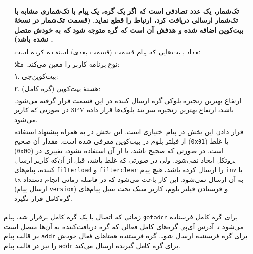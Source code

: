 \begin{xltabular}{\textwidth}{|c|X|}
	\hline
	 & {
		تک‌شمار، یک عدد تصادفی است که اگر یک گره،‌ یک پیام با تک‌شماری مشابه با تک‌شمار ارسالی دریافت کرد، ارتباط را قطع نماید. (قسمت تک‌شمار در نسخهٔ  بیت‌کوین اضافه شده و هدفش آن است که گره متوجه شود که به خودش متصل نشده باشد)
		.
	}\\
	\hline
	 & {
		تعداد بایت‌هایی که پیام قسمت  (قسمت بعدی) استفاده کرده است.
	}\\
	
	\hline
	 & {
		نوع برنامه کاربر را معین می‌کند. مثلا:
	}\\
	
	&  {%
		۱. بیت‌کوین‌جی: 
		} \\
	&  {%
		۲. هستهٔ بیت‌کوین (گره کامل): 
		} \\
	
	\hline
	 & {
		ارتفاع بهترین زنجیره‌ بلوکی گره ارسال کننده در این قسمت قرار گرفته می‌شود. در صورتی که کاربر SPV باشد، ارتفاع بهترین زنجیره سرایند بلوک‌‌ها قرار داده می‌شود.
	}\\
	
	\hline
	 & {
		قرار دادن این بخش در پیام اختیاری است. این بخش در \cite{Hearn2013} به همراه پیشنهاد استفاده از فیلتر بلوم در بیت‌کوین معرفی شده است. مقدار آن صحیح (\texttt{0x01}) یا غلط (\texttt{0x00}) است. در صورتی که صحیح باشد، یا از آن استفاده نشود، تغییری در پروتکل ایجاد نمی‌شود. ولی در صورتی که غلط باشد، قبل از آن‌که کاربر ارسال کننده، پیام‌های \texttt{filterload} و \texttt{filterclear} را ارسال کرده باشد، هیچ پیام \texttt{inv} یا \texttt{tx} به آن ارسال نمی‌شود. این کار باعث می‌شود که در فاصلهٔ زمانی انجام 
		دستداد 
		(ارسال پیام \texttt{version}) و فرستادن فیلتر بلوم، کاربر سبک تحت سیل پیام‌های گره‌کامل قرار نگیرد. 
	}\\
	
	
	\hline
\end{xltabular}

زمانی که اتصال با یک گره کامل برقرار شد، پیام \texttt{getaddr} برای گره کامل فرستاده می‌شود تا آدرس آی‌پی گره‌های کامل فعالی که گره دریافت‌کننده به آن‌ها متصل است در قالب پیام \texttt{addr} برای گره فرستنده ارسال شود. گره فرستنده همتا‌های فعال خودش را نیز در قالب پیام \texttt{addr} برای گره کامل گیرنده ارسال می‌کند.

